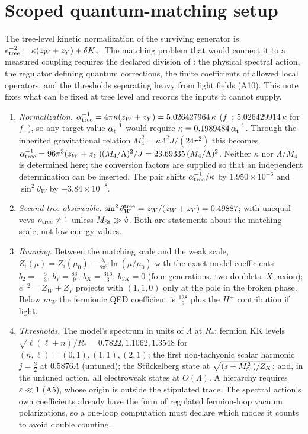 \documentclass[11pt,letterpaper]{article}
\newcommand{\Lam}{\Lambda}
\begin{document}
\section{Scoped quantum-matching setup}

The tree-level kinetic normalization of the surviving generator is $e^{-2}_{\rm tree}=\kappa(z_W+z_Y)+\delta K_\gamma$. The matching problem that would connect it to a measured coupling requires the declared division of \cite{neutral}: the physical spectral action, the regulator defining quantum corrections, the finite coefficients of allowed local operators, and the thresholds separating heavy from light fields (A10). This note fixes what can be fixed at tree level and records the inputs it cannot supply.
\begin{enumerate}
\item \emph{Normalization.} $\alpha^{-1}_{\rm tree}=4\pi\kappa(z_W+z_Y)=5.026427964\,\kappa$ ($f_-$; $5.026429914\,\kappa$ for $f_+$), so any target value $\alpha^{-1}_{\rm t}$ would require $\kappa=0.1989484\,\alpha^{-1}_{\rm t}$. Through the inherited gravitational relation $M_4^2=\kappa\Lam^2J/(24\pi^2)$ this becomes $\alpha^{-1}_{\rm tree}=96\pi^3(z_W+z_Y)(M_4/\Lam)^2/J=23.69335\,(M_4/\Lam)^2$. Neither $\kappa$ nor $\Lam/M_4$ is determined here; the conversion factors are supplied so that an independent determination can be inserted. The pair shifts $\alpha^{-1}_{\rm tree}/\kappa$ by $1.950\times10^{-6}$ and $\sin^2\theta_W$ by $-3.84\times10^{-8}$.
\item \emph{Second tree observable.} $\sin^2\theta_W^{\rm tree}=z_W/(z_W+z_Y)=0.49887$; with unequal vevs $\rho_{\rm tree}\ne1$ unless $M_{\rm St}\gg\hat v$. Both are statements about the matching scale, not low-energy values.
\item \emph{Running.} Between the matching scale and the weak scale, $Z_i(\mu)=Z_i(\mu_0)-\tfrac{b_i}{8\pi^2}\ln(\mu/\mu_0)$ with the exact model coefficients $b_2=-\tfrac53$, $b_Y=\tfrac{83}9$, $b_X=\tfrac{316}3$, $b_{YX}=0$ (four generations, two doublets, $X$, axion); $e^{-2}=Z_W+Z_Y$ projects with $(1,1,0)$ only at the pole in the broken phase. Below $m_W$ the fermionic QED coefficient is $\tfrac{128}9$ plus the $H^\pm$ contribution if light.
\item \emph{Thresholds.} The model's spectrum in units of $\Lam$ at $R_*$: fermion KK levels $\sqrt{\ell(\ell+n)}/R_*=0.7822,1.1062,1.3548$ for $(n,\ell)=(0,1),(1,1),(2,1)$; the first non-tachyonic scalar harmonic $j=\tfrac32$ at $0.5876\Lam$ (untuned); the Stückelberg state at $\sqrt{(s+M_{\rm St}^2)/Z_X}$; and, in the untuned action, all electroweak states at $O(\Lam)$. A hierarchy requires $\varepsilon\ll1$ (A5), whose origin is outside the stipulated trace. The spectral action's own coefficients already have the form of regulated fermion-loop vacuum polarizations, so a one-loop computation must declare which modes it counts to avoid double counting.

\end{enumerate}
\end{document}
